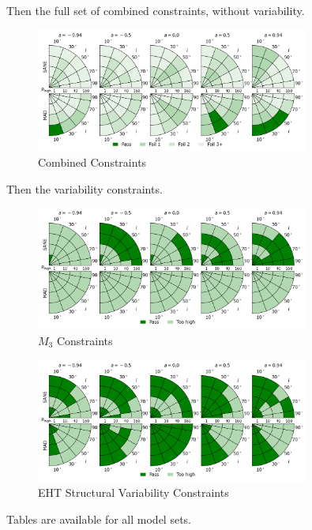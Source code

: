 Then the full set of combined constraints, without variability.

\begin{figure}
  \centering
  \includegraphics[width=0.8\textwidth]{./figures/All_Constraints.png}
  \caption{Combined Constraints}
  \label{fig:all_pizza}
\end{figure}

Then the variability constraints.

\begin{figure}
  \centering
  \includegraphics[width=0.8\textwidth]{./figures/230GHz_3Hr_MI_Constraints.png}
  \caption{$M_3$ Constraints}
  \label{fig:m3_pizza}
\end{figure}

\begin{figure}
  \centering
  \includegraphics[width=0.8\textwidth]{./figures/4Glam_Constraints.png}
  \caption{EHT Structural Variability Constraints}
  \label{fig:ehtvar_pizza}
\end{figure}

Tables are available for all model sets.

\clearpage















\clearpage
